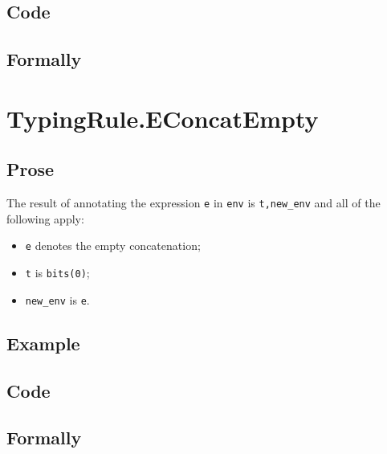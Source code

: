 \documentclass{book}
\begin{document}
  \subsection{Code}

\begin{emptyformal}
    \subsection{Formally}
\end{emptyformal}


\section{TypingRule.EConcatEmpty \label{sec:TypingRule.EConcatEmpty}}

  \subsection{Prose}
  The result of annotating the expression \texttt{e} in \texttt{env} is
\texttt{t,new\_env} and all of the following apply:
  \begin{itemize}
  \item \texttt{e} denotes the empty concatenation;
  \item \texttt{t} is \texttt{bits(0)};
  \item \texttt{new\_env} is \texttt{e}.
  \end{itemize}

  \subsection{Example}

  \subsection{Code}

\begin{emptyformal}
    \subsection{Formally}
\end{emptyformal}
\end{document}
